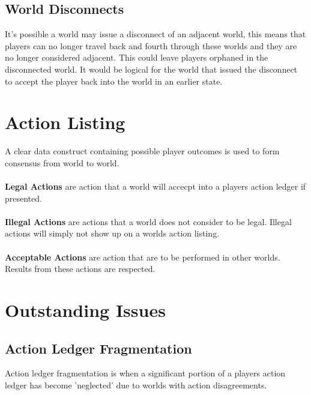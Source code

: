 \documentclass[runningheads,a4paper]{llncs}
\begin{document}
\subsection{World Disconnects}
\label{WD}
It's possible a world may issue a disconnect of an adjacent world, this means that players can no longer travel back and fourth through these worlds and they are no longer considered adjacent. This could leave players orphaned in the disconnected world. It would be logical for the world that issued the disconnect to accept the player back into the world in an earlier state.

\section{Action Listing}
A clear data construct containing possible player outcomes is used to form consensus from world to world.
\\\\
\textbf{Legal Actions} are action that a world will accecpt into a players action ledger if presented.
\\\\
\textbf{Illegal Actions} are actions that a world does not consider to be legal. Illegal actions will simply not show up on a worlds action listing.
\\\\
\textbf{Acceptable Actions} are action that are to be performed in other worlds. Results from these actions are respected.

\section{Outstanding Issues}
\subsection{Action Ledger Fragmentation}
\label{ALF}
Action ledger fragmentation is when a significant portion of a players action ledger has become 'neglected' due to worlds with action disagreements. 
\end{document}
